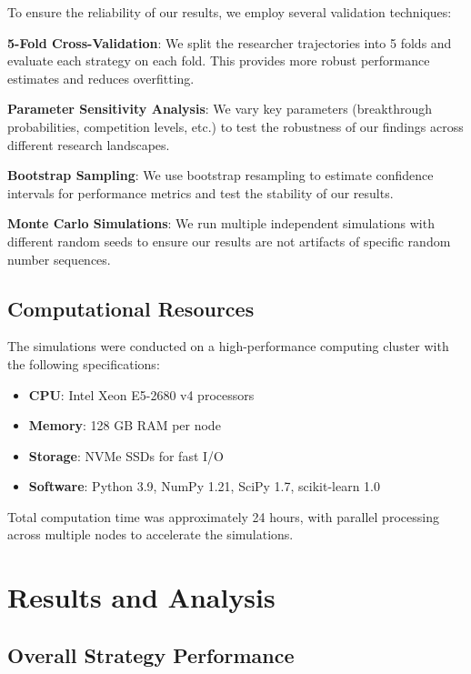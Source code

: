 \documentclass[letterpaper]{article} %
\begin{document}
To ensure the reliability of our results, we employ several validation techniques:

\textbf{5-Fold Cross-Validation}: We split the researcher trajectories into 5 folds and evaluate each strategy on each fold. This provides more robust performance estimates and reduces overfitting.

\textbf{Parameter Sensitivity Analysis}: We vary key parameters (breakthrough probabilities, competition levels, etc.) to test the robustness of our findings across different research landscapes.

\textbf{Bootstrap Sampling}: We use bootstrap resampling to estimate confidence intervals for performance metrics and test the stability of our results.

\textbf{Monte Carlo Simulations}: We run multiple independent simulations with different random seeds to ensure our results are not artifacts of specific random number sequences.

\subsection{Computational Resources}

The simulations were conducted on a high-performance computing cluster with the following specifications:
\begin{itemize}
\item \textbf{CPU}: Intel Xeon E5-2680 v4 processors
\item \textbf{Memory}: 128 GB RAM per node
\item \textbf{Storage}: NVMe SSDs for fast I/O
\item \textbf{Software}: Python 3.9, NumPy 1.21, SciPy 1.7, scikit-learn 1.0
\end{itemize}

Total computation time was approximately 24 hours, with parallel processing across multiple nodes to accelerate the simulations.


\section{Results and Analysis}

\subsection{Overall Strategy Performance}
\end{document}
